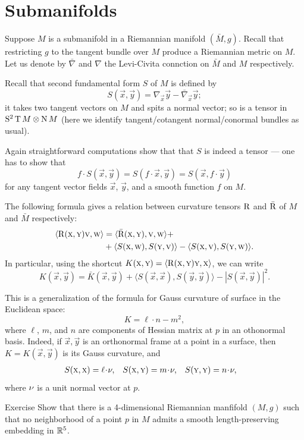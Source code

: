 \section{Submanifolds}\label{sec:submanifolds}

Suppose $M$ is a submanifold in a Riemannian manifold $(\bar M,g)$.
Recall that restricting $g$ to the tangent bundle over $M$ produce a Riemannian metric on $M$.
Let us denote by $\bar\nabla $ and $\nabla$ the Levi-Civita connction on $\bar M$ and $M$ respectively.

Recall that second fundamental form $S$ of $M$ is defined by
\[S(\vec x,\vec y)=\nabla_{\vec x}\vec y-\bar\nabla_{\vec x}\vec y;\]
it takes two tangent vectors on $M$ and spits a normal vector;
so is a tensor in $\mathrm{S}^2\operatorname{\rm T} M\otimes \operatorname{\rm N} M$ (here we identify tangent/cotangent normal/conormal bundles as usual).

Again straightforward computations show that that $S$ is indeed a tensor --- one has to show that 
\[f\cdot S(\vec x,\vec y)=S(f\cdot \vec x,\vec y)=S(\vec x,f\cdot \vec y)\]
for any tangent vector fields $\vec x$, $\vec y$, and a smooth function $f$ on $M$.

The following formula gives a relation between curvature tensors $\operatorname{\rm R}\nolimits$ and $\bar {\operatorname{\rm R}\nolimits}$ of $M$ and $\bar M$ respectively:
\begin{align*}
\langle \operatorname{\rm R}\nolimits(\textsc x,\textsc y)\textsc v,\textsc w\rangle
&=
\langle \bar {\operatorname{\rm R}\nolimits}(\textsc x,\textsc y),\textsc v,\textsc w\rangle
+
\\
&+
\langle S(\textsc x,\textsc w),S(\textsc y,\textsc v)\rangle
-
\langle S(\textsc x,\textsc v),S(\textsc y,\textsc w)\rangle
.\end{align*}
In particular, using the shortcut $K(\textsc x,\textsc y)=\langle \operatorname{\rm R}\nolimits(\textsc x,\textsc y)\textsc y,\textsc x\rangle$, we can write
\[K(\vec x,\vec y)=\bar K(\vec x,\vec y)+\langle S(\vec x,\vec x),S(\vec y,\vec y)\rangle
-
|S(\vec x,\vec y)|^2.\]

This is a generalization of the formula for Gauss curvature of surface in the Euclidean space:
\[K=\ell\cdot n-m^2,\]
where $\ell$, $m$, and $n$ are components of Hessian matrix at $p$ in an othonormal basis.
Indeed, if $\vec x,\vec y$ is an orthonormal frame at a point in a surface, then $K=K(\vec x,\vec y)$ is its Gauss curvature, and
\begin{align*}
S(\vec x,\vec x)&=\ell\cdot\Norm,
&
S(\vec x,\vec y)&=m\cdot\Norm,
&
S(\vec y,\vec y)&=n\cdot\Norm,
\end{align*}
where $\nu$ is a unit normal vector at $p$.

\begin{thm}{Exercise}\label{ex:4-hypersurface}
Show that there is a 4-dimensional Riemannian manfifold $(M,g)$ such that no neighborhood of a point $p$ in $M$ admits a smooth length-preserving embedding in $\mathbb{R}^5$.
\end{thm}

